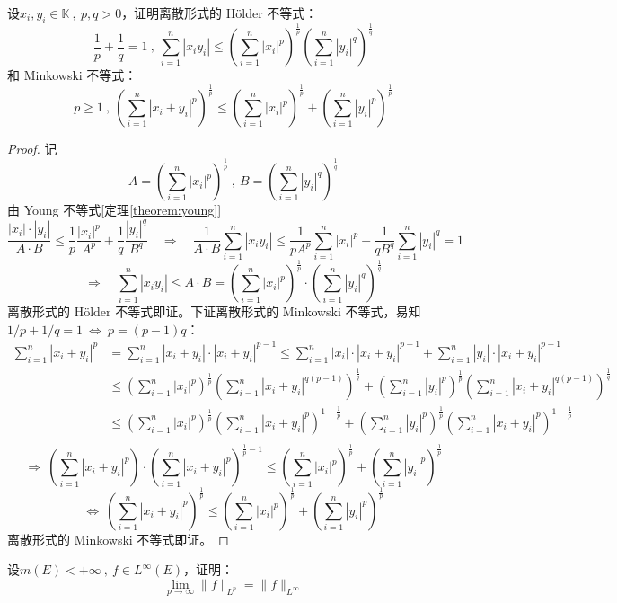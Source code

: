 \begin{example}
\quad 设$x_i,y_i \in \mathbb{K} \ , \ p,q>0$，证明离散形式的 H\"{o}lder 不等式：
\[\frac{1}{p}+\frac{1}{q}=1 \ , \ \sum_{i=1}^n|x_iy_i| \leq \left(\sum_{i=1}^n|x_i|^p\right)^{\frac{1}{p}}\left(\sum_{i=1}^n|y_i|^q\right)^{\frac{1}{q}}\]
和 Minkowski 不等式：
\[p \geq 1 \ , \ \left(\sum_{i=1}^n|x_i+y_i|^p\right)^{\frac{1}{p}} \leq \left(\sum_{i=1}^n|x_i|^p\right)^{\frac{1}{p}}+\left(\sum_{i=1}^n|y_i|^p\right)^{\frac{1}{p}}\]
\end{example}
\begin{proof}
记
\[A=\left(\sum_{i=1}^n|x_i|^p\right)^{\frac{1}{p}} \ , \ B=\left(\sum_{i=1}^n|y_i|^q\right)^{\frac{1}{q}}\]
由 Young 不等式[定理\ref{theorem:young}]
\[\frac{|x_i| \cdot |y_i|}{A \cdot B} \leq \frac{1}{p}\frac{|x_i|^p}{A^p}+\frac{1}{q}\frac{|y_i|^q}{B^q} \quad \Rightarrow \quad \frac{1}{A \cdot B}\sum_{i=1}^n|x_iy_i| \leq \frac{1}{pA^p}\sum_{i=1}^n|x_i|^p+\frac{1}{qB^q}\sum_{i=1}^n|y_i|^q=1\]
\[\Rightarrow \quad \sum_{i=1}^n|x_iy_i| \leq A \cdot B=\left(\sum_{i=1}^n|x_i|^p\right)^{\frac{1}{p}} \cdot \left(\sum_{i=1}^n|y_i|^q\right)^{\frac{1}{q}}\]
离散形式的 H\"{o}lder 不等式即证。下证离散形式的 Minkowski 不等式，易知$1/p+1/q=1 \ \Leftrightarrow \ p=(p-1)q$：
\[\begin{aligned}
\sum_{i=1}^n|x_i+y_i|^p&=\sum_{i=1}^n|x_i+y_i|\cdot|x_i+y_i|^{p-1} \leq \sum_{i=1}^n|x_i|\cdot|x_i+y_i|^{p-1}+\sum_{i=1}^n|y_i|\cdot|x_i+y_i|^{p-1}\\
&\leq \left(\sum_{i=1}^n|x_i|^p\right)^{\frac{1}{p}}\left(\sum_{i=1}^n|x_i+y_i|^{q(p-1)}\right)^{\frac{1}{q}}+\left(\sum_{i=1}^n|y_i|^p\right)^{\frac{1}{p}}\left(\sum_{i=1}^n|x_i+y_i|^{q(p-1)}\right)^{\frac{1}{q}}\\
&\leq \left(\sum_{i=1}^n|x_i|^p\right)^{\frac{1}{p}}\left(\sum_{i=1}^n|x_i+y_i|^{p}\right)^{1-\frac{1}{p}}+\left(\sum_{i=1}^n|y_i|^p\right)^{\frac{1}{p}}\left(\sum_{i=1}^n|x_i+y_i|^{p}\right)^{1-\frac{1}{p}}\\
\end{aligned}\]
\[\Rightarrow \ \left(\sum_{i=1}^n|x_i+y_i|^p\right) \cdot \left(\sum_{i=1}^n|x_i+y_i|^{p}\right)^{\frac{1}{p}-1} \leq \left(\sum_{i=1}^n|x_i|^p\right)^{\frac{1}{p}}+\left(\sum_{i=1}^n|y_i|^p\right)^{\frac{1}{p}}\]
\[\Leftrightarrow \ \left(\sum_{i=1}^n|x_i+y_i|^{p}\right)^{\frac{1}{p}} \leq \left(\sum_{i=1}^n|x_i|^p\right)^{\frac{1}{p}}+\left(\sum_{i=1}^n|y_i|^p\right)^{\frac{1}{p}}\]
离散形式的 Minkowski 不等式即证。
\end{proof}
\newpage
\begin{example}
\quad 设$m(E)<+\infty \ , \ f \in L^{\infty}(E)$，证明：
\[\lim_{p \to \infty}\|f\|_{L^p}=\|f\|_{L^{\infty}}\]
\end{example}
